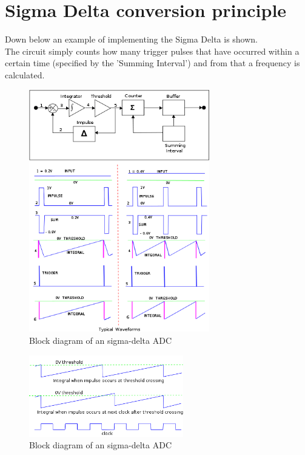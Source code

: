 \section{Sigma Delta conversion principle}
Down below an example of implementing the Sigma Delta is shown.
\\ The circuit simply counts how many trigger pulses that have occurred within a certain time (specified by the 'Summing Interval') and
from that a frequency is calculated.
\begin{figure}[h!]		%
	\begin{centering}
 		\includegraphics[width=0.7\textwidth]{images/sigma_delta.png}
		\caption{Block diagram of an sigma-delta ADC}
	\end{centering}
\end{figure}

\newpage
\begin{figure}[h!]		%
	\begin{centering}
 		\includegraphics[width=0.6\textwidth]{images/sigma_delta2.png}
		\caption{Block diagram of an sigma-delta ADC}
	\end{centering}
\end{figure}

